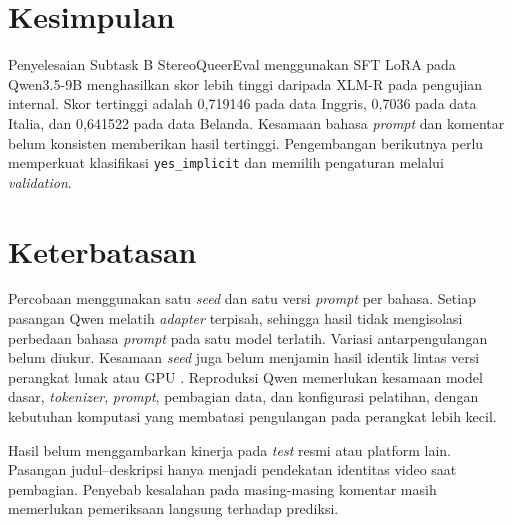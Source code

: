 \documentclass[11pt]{article}
\begin{document}
\section{Kesimpulan}
Penyelesaian Subtask B StereoQueerEval menggunakan SFT LoRA pada Qwen3.5-9B menghasilkan skor lebih tinggi daripada XLM-R pada pengujian internal. Skor tertinggi adalah 0,719146 pada data Inggris, 0,7036 pada data Italia, dan 0,641522 pada data Belanda. Kesamaan bahasa \textit{prompt} dan komentar belum konsisten memberikan hasil tertinggi. Pengembangan berikutnya perlu memperkuat klasifikasi \texttt{yes\_implicit} dan memilih pengaturan melalui \textit{validation}.

\section*{Keterbatasan}
Percobaan menggunakan satu \textit{seed} dan satu versi \textit{prompt} per bahasa. Setiap pasangan Qwen melatih \textit{adapter} terpisah, sehingga hasil tidak mengisolasi perbedaan bahasa \textit{prompt} pada satu model terlatih. Variasi antarpengulangan belum diukur. Kesamaan \textit{seed} juga belum menjamin hasil identik lintas versi perangkat lunak atau GPU \citep{pytorch-reproducibility}. Reproduksi Qwen memerlukan kesamaan model dasar, \textit{tokenizer}, \textit{prompt}, pembagian data, dan konfigurasi pelatihan, dengan kebutuhan komputasi yang membatasi pengulangan pada perangkat lebih kecil.

Hasil belum menggambarkan kinerja pada \textit{test} resmi atau platform lain. Pasangan judul--deskripsi hanya menjadi pendekatan identitas video saat pembagian. Penyebab kesalahan pada masing-masing komentar masih memerlukan pemeriksaan langsung terhadap prediksi.


\end{document}
